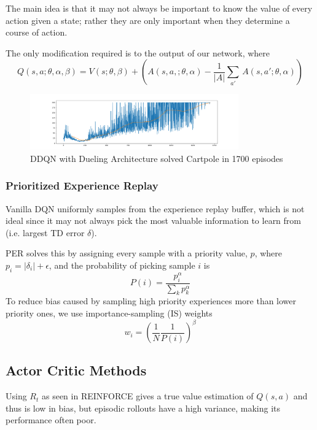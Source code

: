 \documentclass[11pt]{article} %
\begin{document}
The main idea is that it may not always be important to know the value of every action given a state; rather they are only important when they determine a course of action.

The only modification required is to the output of our network, where 
\begin{equation*}
    Q(s,a;\theta,\alpha,\beta) = V(s; \theta, \beta) + (A(s,a,;\theta,\alpha) - \frac{1}{|A|}\sum_{a'}\, A(s,a';\theta,\alpha))
\end{equation*}

\begin{figure}
    \centering
    \includegraphics[width=0.8\textwidth]{DQN/Dueling-Double_w_ER_FixedQ/cartpole/1700eps_cartpole.png}
    \caption{DDQN with Dueling Architecture solved Cartpole in 1700 episodes}
    \label{fig:my_label}
\end{figure}

\subsubsection{Prioritized Experience Replay}
Vanilla DQN uniformly samples from the experience replay buffer, which is not ideal since it may not always pick the most valuable information to learn from (i.e. largest TD error $\delta$).

PER solves this by assigning every sample with a priority value, $p$, where $p_i = |\delta_i| + \epsilon$, and the probability of picking sample $i$ is
\begin{equation*}
    P(i) = \frac{p_i^\alpha}{\sum_k p_k^\alpha}
\end{equation*}
To reduce bias caused by sampling high priority experiences more than lower priority ones, we use importance-sampling (IS) weights
\begin{equation*}
    w_i = (\frac{1}{N}\frac{1}{P(i)})^\beta
\end{equation*}

\subsection{Actor Critic Methods}
Using $R_t$ as seen in REINFORCE gives a true value estimation of $Q(s,a)$ and thus is low in bias, but episodic rollouts have a high variance, making its performance often poor.
\end{document}

